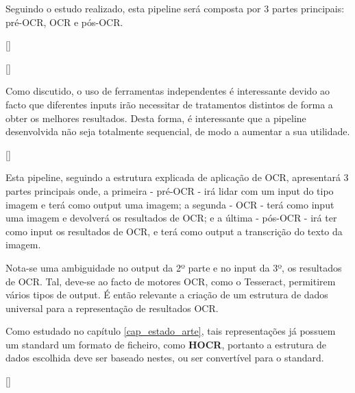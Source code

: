 Seguindo o estudo realizado, esta pipeline será composta por 3 partes principais: pré-OCR, OCR e pós-OCR.





[\normalsize]

[\normalsize]
 
 
Como discutido, o uso de ferramentas independentes é interessante devido ao facto que diferentes inputs irão necessitar de tratamentos distintos de forma a obter os melhores resultados. Desta forma, é interessante que a pipeline desenvolvida não seja totalmente sequencial, de modo a aumentar a sua utilidade.


[\normalsize]

Esta pipeline, seguindo a estrutura explicada de aplicação de OCR, apresentará 3 partes principais onde, a primeira - pré-OCR - irá lidar com um input do tipo imagem e terá como output uma imagem; a segunda - OCR - terá como input uma imagem e devolverá os resultados de OCR; e a última - pós-OCR - irá ter como input os resultados de OCR, e terá como output a transcrição do texto da imagem.

Nota-se uma ambiguidade no output da 2º parte e no input da 3º, os resultados de OCR. Tal, deve-se ao facto de motores OCR, como o Tesseract, permitirem vários tipos de output. É então relevante a criação de um estrutura de dados universal para a representação de resultados OCR.

Como estudado no capítulo \ref{cap_estado_arte}, tais representações já possuem um standard um formato de ficheiro, como \textbf{HOCR}, portanto a estrutura de dados escolhida deve ser baseado nestes, ou ser convertível para o standard.


[\normalsize]

